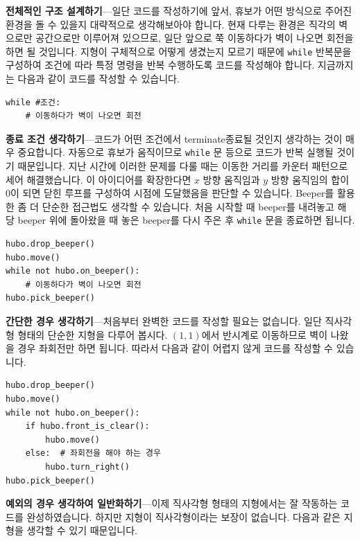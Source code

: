 \documentclass[../main.tex]{subfiles}
\begin{document}
\textbf{전체적인 구조 설계하기}---일단 코드를 작성하기에 앞서, 휴보가 어떤 방식으로 주어진 환경을 돌 수 있을지 대략적으로 생각해보아야 합니다.
현재 다루는 환경은 직각의 벽으로만 공간으로만 이루어져 있으므로, 일단 앞으로 쭉 이동하다가 벽이 나오면 회전을 하면 될 것입니다.
지형이 구체적으로 어떻게 생겼는지 모르기 때문에 \texttt{while} 반복문을 구성하여 조건에 따라 특정 명령을 반복 수행하도록 코드를 작성해야 합니다.
지금까지는 다음과 같이 코드를 작성할 수 있습니다.
\begin{verbatim}
while #조건:
    # 이동하다가 벽이 나오면 회전
\end{verbatim}

\textbf{종료 조건 생각하기}---코드가 어떤 조건에서 terminate종료될 것인지 생각하는 것이 매우 중요합니다.
자동으로 휴보가 움직이므로 \texttt{while} 문 등으로 코드가 반복 실행될 것이기 때문입니다.
지난 시간에 이러한 문제를 다룰 때는 이동한 거리를 카운터 패턴으로 세어 해결했습니다.
이 아이디어를 확장한다면 $x$ 방향 움직임과 $y$ 방향 움직임의 합이 0이 되면 닫힌 루프를 구성하여 시점에 도달했음을 판단할 수 있습니다.
Beeper를 활용한 좀 더 단순한 접근법도 생각할 수 있습니다.
처음 시작할 때 beeper를 내려놓고 해당 beeper 위에 돌아왔을 때 놓은 beeper를 다시 주은 후 \texttt{while} 문을 종료하면 됩니다.
\begin{verbatim}
hubo.drop_beeper()
hubo.move()
while not hubo.on_beeper():
    # 이동하다가 벽이 나오면 회전
hubo.pick_beeper()
\end{verbatim}

\textbf{간단한 경우 생각하기}---처음부터 완벽한 코드를 작성할 필요는 없습니다.
일단 직사각형 형태의 단순한 지형을 다루어 봅시다.
$(1, 1)$에서 반시계로 이동하므로 벽이 나왔을 경우 좌회전만 하면 됩니다.
따라서 다음과 같이 어렵지 않게 코드를 작성할 수 있습니다.
\begin{verbatim}
hubo.drop_beeper()
hubo.move()
while not hubo.on_beeper():
    if hubo.front_is_clear():
        hubo.move()
    else:  # 좌회전을 해야 하는 경우
        hubo.turn_right()
hubo.pick_beeper()
\end{verbatim}

\textbf{예외의 경우 생각하여 일반화하기}---이제 직사각형 형태의 지형에서는 잘 작동하는 코드를 완성하였습니다.
하지만 지형이 직사각형이라는 보장이 없습니다.
다음과 같은 지형을 생각할 수 있기 때문입니다.
\end{document}
